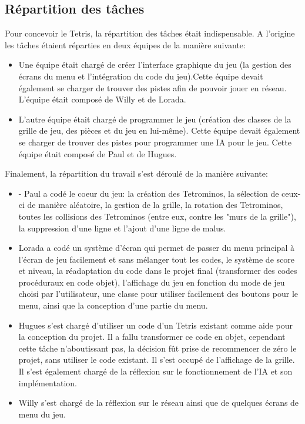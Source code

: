 \documentclass[a4paper, 11pt]{article}
\begin{document}
        \subsection{Répartition des tâches}
            Pour concevoir le Tetris, la répartition des tâches était indispensable. A l'origine les tâches étaient réparties en deux équipes de la manière suivante:
            \begin{itemize}
                \item Une équipe était chargé de créer l'interface graphique du jeu (la gestion des écrans du menu et l'intégration du code du jeu).Cette équipe devait également se charger de trouver des pistes afin de pouvoir jouer en réseau. L'équipe était composé de Willy et de Lorada.
                \item L'autre équipe était chargé de programmer le jeu (création des classes de la grille de jeu, des pièces et du jeu en lui-même). Cette équipe devait également se charger de trouver des pistes pour programmer une IA pour le jeu. Cette équipe était composé de Paul et de Hugues.
            \newline
            \end{itemize}
            Finalement, la répartition du travail s'est déroulé de la manière suivante:
            
            \begin{itemize}
                \item - Paul a codé le coeur du jeu: la création des Tetrominos, la sélection de ceux-ci de manière aléatoire, la gestion de la grille, la rotation des Tetrominos, toutes les collisions des Tetrominos (entre eux, contre les "murs de la grille"), la suppression d'une ligne et l'ajout d'une ligne de malus.
                \item Lorada a codé un système d'écran qui permet de passer du menu principal à l'écran de jeu facilement et sans mélanger tout les codes, le système de score et niveau, la réadaptation du code dans le projet final (transformer des codes procéduraux en code objet), l'affichage du jeu en fonction du mode de jeu choisi par l'utilisateur, une classe pour utiliser facilement des boutons pour le menu, ainsi que la conception d'une partie du menu.
                \item Hugues s'est chargé d'utiliser un code d'un Tetris existant comme aide pour la conception du projet. Il a fallu transformer ce code en objet, cependant cette tâche n'aboutissant pas, la décision fût prise de recommencer de zéro le projet, sans utiliser le code existant. Il s'est occupé de l'affichage de la grille. Il s'est également chargé de la réflexion sur le fonctionnement de l'IA et son implémentation.
                \item Willy s'est chargé de la réflexion sur le réseau ainsi que de quelques écrans de menu du jeu.
            \end{itemize}
       
\end{document}
